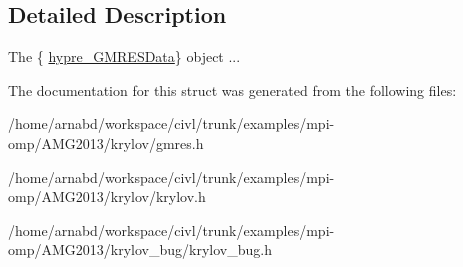 \subsection{Detailed Description}
The \{ \hyperlink{structhypre__GMRESData}{hypre\+\_\+\+G\+M\+R\+E\+S\+Data}\} object ... 

The documentation for this struct was generated from the following files\+:\begin{DoxyCompactItemize}
\item 
/home/arnabd/workspace/civl/trunk/examples/mpi-\/omp/\+A\+M\+G2013/krylov/gmres.\+h\item 
/home/arnabd/workspace/civl/trunk/examples/mpi-\/omp/\+A\+M\+G2013/krylov/krylov.\+h\item 
/home/arnabd/workspace/civl/trunk/examples/mpi-\/omp/\+A\+M\+G2013/krylov\+\_\+bug/krylov\+\_\+bug.\+h\end{DoxyCompactItemize}
